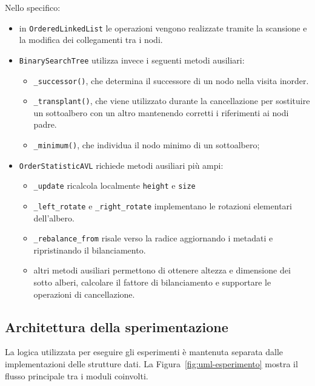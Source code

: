 \documentclass[a4paper,11pt]{article}
\begin{document}
Nello specifico: 
\begin{itemize}
    \item in \texttt{OrderedLinkedList} le operazioni vengono realizzate tramite la scansione e la modifica dei collegamenti tra i nodi.
    
    \item \texttt{BinarySearchTree} utilizza invece i seguenti metodi ausiliari: 
    \begin{itemize}
        \item \texttt{\_successor()}, che  determina il successore di un nodo nella visita inorder.
        
        \item \texttt{\_transplant()}, che viene utilizzato durante la cancellazione per sostituire un sottoalbero con un altro mantenendo corretti i riferimenti ai nodi padre.

        \item \texttt{\_minimum()}, che individua il nodo minimo di un sottoalbero;
    \end{itemize}
    
    \item \texttt{OrderStatisticAVL} richiede metodi ausiliari più ampi:
    \begin{itemize}
        \item \texttt{\_update} ricalcola localmente \texttt{height} e \texttt{size}
        \item \texttt{\_left\_rotate} e \texttt{\_right\_rotate} implementano le rotazioni elementari dell'albero.
        
        \item \texttt{\_rebalance\_from} risale verso la radice aggiornando i metadati e ripristinando il bilanciamento.
        
        \item altri metodi ausiliari permettono di ottenere altezza e dimensione dei sotto alberi, calcolare il fattore di bilanciamento e supportare le operazioni di cancellazione.
    \end{itemize}
\end{itemize}


\subsection{Architettura della sperimentazione} 
La logica utilizzata per eseguire gli esperimenti è mantenuta separata dalle implementazioni delle strutture dati. La Figura~\ref{fig:uml-esperimento} mostra il flusso principale tra i moduli coinvolti.
\end{document}
